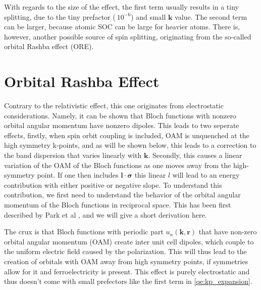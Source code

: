 With regards to the size of the effect, the first term usually results in a tiny splitting, due to the tiny prefactor ($~10^{-6}$) and small $\bm{k}$ value. The second term can be larger, because atomic SOC can be large for heavier atoms. There is, however, another possible source of spin splitting, originating from the so-called orbital Rashba effect (ORE).

\section{Orbital Rashba Effect}
Contrary to the relativistic effect, this one originates from electrostatic considerations. Namely, it can be shown that Bloch functions with nonzero orbital angular momentum have nonzero dipoles. This leads to two seperate effects, firstly, when spin orbit coupling is included, OAM is unquenched at the high symmetry k-points, and as will be shown below, this leads to a correction to the band dispersion that varies linearly with $\bm{k}$. Secondly, this causes a linear variation of the OAM of the Bloch functions as one moves away from the high-symmetry point. If one then includes $\bm{l}\cdot\bm{\sigma}$ this linear $l$ will lead to an energy contribution with either positive or negative slope.
To understand this contribution, we first need to understand the behavior of the orbital angular momentum of the Bloch functions in reciprocal space. This has been first described by Park et al \cite{Park2011}, and we will give a short derivation here.

The crux is that Bloch functions with periodic part $u_n(\bm{k},\bm{r})$ that have non-zero orbital angular momentum (OAM) create inter unit cell dipoles, which couple to the uniform electric field caused by the polarization. This will thus lead to the creation of orbitals with OAM away from high symmetry points, if symmetries allow for it and ferroelectricity is present. This effect is purely electrostatic and thus doesn't come with small prefectors like the first term in \ref{qe:kp_expansion}.

